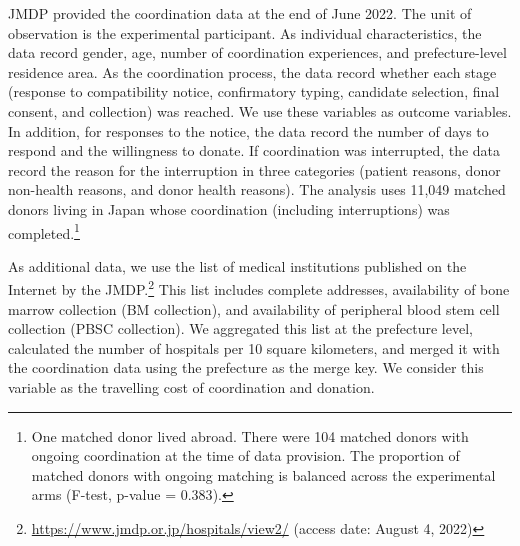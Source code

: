 \documentclass[
]{article}
\begin{document}
JMDP provided the coordination data at the end of June 2022. The unit of observation is the experimental participant. As individual characteristics, the data record gender, age, number of coordination experiences, and prefecture-level residence area. As the coordination process, the data record whether each stage (response to compatibility notice, confirmatory typing, candidate selection, final consent, and collection) was reached. We use these variables as outcome variables. In addition, for responses to the notice, the data record the number of days to respond and the willingness to donate. If coordination was interrupted, the data record the reason for the interruption in three categories (patient reasons, donor non-health reasons, and donor health reasons). The analysis uses 11,049 matched donors living in Japan whose coordination (including interruptions) was completed.\footnote{One matched donor lived abroad. There were 104 matched donors with ongoing coordination at the time of data provision. The proportion of matched donors with ongoing matching is balanced across the experimental arms (F-test, p-value = \(0.383\)).}

As additional data, we use the list of medical institutions published on the Internet by the JMDP.\footnote{\url{https://www.jmdp.or.jp/hospitals/view2/} (access date: August 4, 2022)} This list includes complete addresses, availability of bone marrow collection (BM collection), and availability of peripheral blood stem cell collection (PBSC collection). We aggregated this list at the prefecture level, calculated the number of hospitals per 10 square kilometers, and merged it with the coordination data using the prefecture as the merge key. We consider this variable as the travelling cost of coordination and donation.
\end{document}
